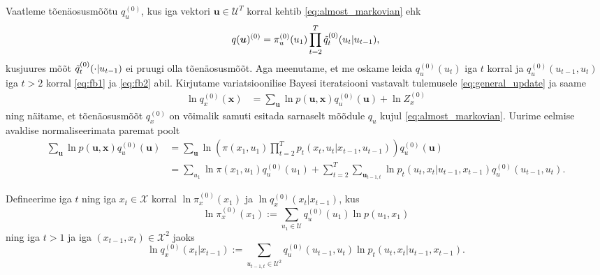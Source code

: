 Vaatleme tõenäosusmõõtu $q_u^{(0)}$, kus iga vektori $\bm{u} \in \mathcal{U}^T$ korral kehtib \eqref{eq:almost_markovian} ehk
\begin{equation*}
    q(\bm{u})^{(0)} = \pi_u^{(0)}(u_1) \prod_{t=2}^T \Tilde{q}_t^{(0)}(u_t|u_{t-1}),
\end{equation*}
kusjuures mõõt $\Tilde{q}_t^{(0)}(\cdot|u_{t-1})$ ei pruugi olla tõenäosusmõõt. Aga meenutame, et me oskame leida $q_u^{(0)}(u_t)$ iga $t$ korral ja $q_u^{(0)}(u_{t-1},u_t)$ iga $t>2$ korral \eqref{eq:fb1} ja \eqref{eq:fb2} abil.
Kirjutame variatsioonilise Bayesi iteratsiooni vastavalt tulemusele \eqref{eq:general_update} ja saame
\begin{align}
    \label{eq:bp_update}
    \ln q_x^{(0)}(\bm{x}) &= \sum_{\bm{u}} \ln p(\bm{u},\bm{x}) q_u^{(0)}(\bm{u}) + \ln Z_x^{(0)}
\end{align}
ning näitame, et tõenäosusmõõt $q_x^{(0)}$ on võimalik samuti esitada sarnaselt mõõdule $q_u$ kujul \eqref{eq:almost_markovian}. Uurime eelmise avaldise normaliseerimata paremat poolt
\begin{align*}
    \sum_{\bm{u}} \ln p(\bm{u},\bm{x}) q_u^{(0)}(\bm{u}) &=  \sum_{\bm{u}} \ln \left( \pi(x_1, u_1) \prod_{t=2}^T p_t(x_t,u_t | x_{t-1}, u_{t-1}) \right) q_u^{(0)}(\bm{u}) \\
    &= \sum_{u_1} \ln \pi(x_1, u_1) q_u^{(0)}(u_1)  + \sum_{t=2}^T \sum_{\bm{u}_{t-1,t}} \ln p_t(u_t,x_t | u_{t-1}, x_{t-1}) q_u^{(0)}(u_{t-1},u_{t}).
\end{align*}

Defineerime iga $t$ ning iga $x_t \in \mathcal{X}$ korral $\ln \pi_x^{(0)}(x_1)$ ja $\ln q_x^{(0)}(x_t | x_{t-1})$, kus
$$\ln \pi_x^{(0)}(x_1) := \sum_{u_1 \in \mathcal{U}}  q_u^{(0)}(u_1) \ln p(u_1,x_1)$$
ning iga $t > 1$ ja iga $(x_{t-1}, x_t) \in \mathcal{X}^2$ jaoks
$$\ln q_x^{(0)}(x_{t}|x_{t-1}) := \sum_{u_{t-1,t} \in \mathcal{U}^2}  q_u^{(0)}(u_{t-1}, u_t) \ln p_t(u_{t},x_t | u_{t-1},x_{t-1}).$$ 

